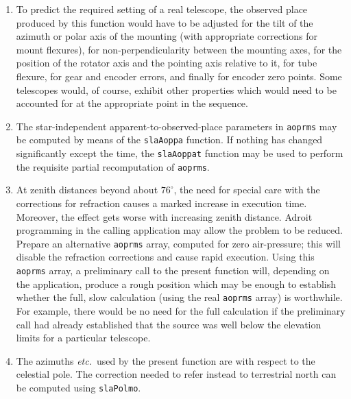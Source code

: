 \documentclass[11pt,fleqn,twoside]{article}
\renewcommand{\_}{{\tt\char'137}}     %
\begin{document}
{\begin{enumerate}
        motion, and is the position that would be seen by a perfect
        equatorial located at the observer and with its polar axis
        aligned to the Earth's axis of rotation ({\it n.b.}\ not to the
        refracted pole).  Finally, the $\alpha$ is obtained by subtracting
        the {\it h}\/ from the local apparent ST.
  \item To predict the required setting of a real telescope, the
        observed place produced by this function would have to be
        adjusted for the tilt of the azimuth or polar axis of the
        mounting (with appropriate corrections for mount flexures),
        for non-perpendicularity between the mounting axes, for the
        position of the rotator axis and the pointing axis relative
        to it, for tube flexure, for gear and encoder errors, and
        finally for encoder zero points.  Some telescopes would, of
        course, exhibit other properties which would need to be
        accounted for at the appropriate point in the sequence.
  \item The star-independent apparent-to-observed-place parameters
        in {\tt aoprms} may be computed by means of the {\tt slaAoppa} function.
        If nothing has changed significantly except the time, the
        {\tt slaAoppat} function may be used to perform the requisite
        partial recomputation of {\tt aoprms}.
  \item At zenith distances beyond about $76^\circ$, the need for
        special care with the corrections for refraction causes a
        marked increase in execution time.  Moreover, the effect
        gets worse with increasing zenith distance.  Adroit
        programming in the calling application may allow the
        problem to be reduced.  Prepare an alternative {\tt aoprms} array,
        computed for zero air-pressure;  this will disable the
        refraction corrections and cause rapid execution.  Using
        this {\tt aoprms} array, a preliminary call to the present function
        will, depending on the application, produce a rough position
        which may be enough to establish whether the full, slow
        calculation (using the real {\tt aoprms} array) is worthwhile.
        For example, there would be no need for the full calculation
        if the preliminary call had already established that the
        source was well below the elevation limits for a particular
        telescope.
  \item The azimuths {\it etc.}\ used by the present function are with
        respect to the celestial pole.
        The correction needed to refer instead to terrestrial north
        can be computed using {\tt slaPolmo}.
 \end{enumerate}
}
\end{document}
